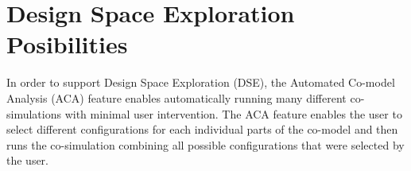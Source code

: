 \documentclass{crescendorepchap}
\newcommand{\url}[1]{\texttt{#1}}
\begin{document}







\chapter{Design Space Exploration Posibilities}\label{chap:DSE}

In order to support Design Space Exploration (DSE), the Automated
Co-model Analysis (ACA) feature enables automatically running many different
co-simulations with minimal user intervention. The ACA feature enables
the user to select different configurations for each individual parts of
the co-model and then runs the co-simulation combining all possible
configurations that were selected by the user.
\end{document}

